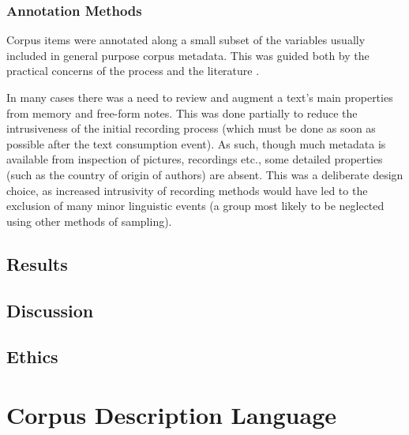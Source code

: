 \subsubsection{Annotation Methods}
Corpus items were annotated along a small subset of the variables usually included in general purpose corpus metadata.  This was guided both by the practical concerns of the process and the literature %
.

In many cases there was a need to review and augment a text's main properties from memory and free-form notes.  This was done partially to reduce the intrusiveness of the initial recording process (which must be done as soon as possible after the text consumption event).  As such, though much metadata is available from inspection of pictures, recordings etc., some detailed properties (such as the country of origin of authors) are absent.  This was a deliberate design choice, as increased intrusivity of recording methods would have led to the exclusion of many minor linguistic events (a group most likely to be neglected using other methods of sampling).



\subsection{Results}

\subsection{Discussion}

\subsection{Ethics}













\section{Corpus Description Language}

